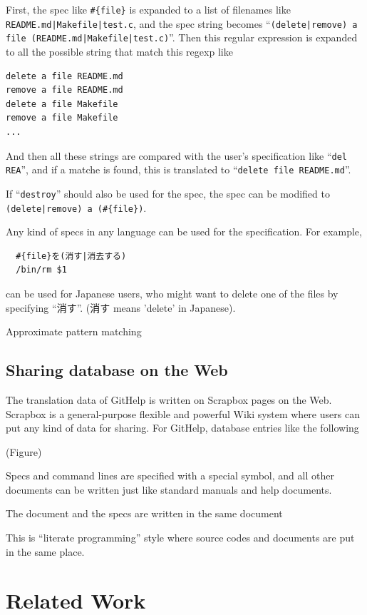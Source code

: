 \documentclass{sigchi}
\def\GH{\textsf{GitHelp}}
\def\SB{\textsf{Scrapbox}}
\begin{document}
First, the spec like \verb|#{file}| is expanded to a list of filenames like
\verb+README.md|Makefile|test.c+,
and the spec string becomes
``\verb+(delete|remove) a file (README.md|Makefile|test.c)+''.
Then this regular expression is expanded to all the possible string that match this regexp like
\begin{verbatim}
delete a file README.md
remove a file README.md
delete a file Makefile
remove a file Makefile
...
\end{verbatim}

And then all these strings are compared with the user's specification like
``\verb|del REA|'',
and if a matche is found,
this is translated to
``\verb|delete file README.md|''.

If ``\verb|destroy|'' should also be used for the spec,
the spec can be modified to 
\verb+(delete|remove) a (#{file})+.

Any kind of specs in any language can be used for the specification.
For example,

\begin{verbatim}
  #{file}を(消す|消去する)
  /bin/rm $1
\end{verbatim}

can be  used for Japanese users, who might want to delete
one of the files by specifying ``消す''.
(消す means 'delete' in Japanese).


Approximate pattern matching


\subsection{Sharing database on the Web}

The translation data of {\GH} is written on {\SB} pages on the Web.
{\SB} is a general-purpose flexible and powerful Wiki system where
users can put any kind of data for sharing.
For {\GH}, database entries like the following

(Figure)

Specs and command lines are specified with a special symbol, and
all other documents can be written just like standard manuals and help documents.

The document and the specs are written in the same document

This is
``literate programming'' style where
source codes and documents are put in the same place.

\section{Related Work}
\end{document}
